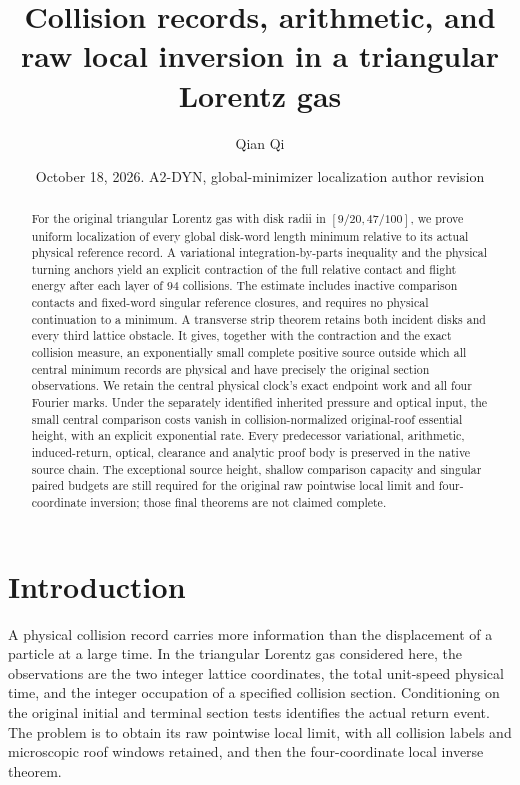 \documentclass[11pt,reqno]{amsart}
\title[Collision records and raw local inversion]{Collision records, arithmetic, and raw local inversion in a triangular Lorentz gas}
\author{Qian Qi}
\date{October 18, 2026. A2-DYN, global-minimizer localization author revision}
\numberwithin{equation}{section}
\theoremstyle{definition}\newtheorem{definition}[theorem]{Definition}
\theoremstyle{remark}\newtheorem{remark}[theorem]{Remark}
\begin{document}
\raggedbottom
\begin{abstract}
For the original triangular Lorentz gas with disk radii in
$[9/20,47/100]$, we prove uniform localization of every global
disk-word length minimum relative to its actual physical reference
record.  A variational integration-by-parts inequality and the
physical turning anchors yield an explicit contraction of the full
relative contact and flight energy after each layer of $94$
collisions.  The estimate includes inactive comparison contacts and
fixed-word singular reference closures, and requires no physical
continuation to a minimum.  A transverse strip theorem retains both
incident disks and every third lattice obstacle.  It gives, together
with the contraction and the exact collision measure, an
exponentially small complete positive source outside which all
central minimum records are physical and have precisely the original
section observations.  We retain the central physical clock's exact
endpoint work and all four Fourier marks.  Under the separately
identified inherited pressure and optical input, the small central
comparison costs vanish in collision-normalized original-roof
essential height, with an explicit exponential rate.  Every
predecessor variational, arithmetic, induced-return, optical,
clearance and analytic proof body is preserved in the native source
chain.  The exceptional source height, shallow comparison capacity
and singular paired budgets are still required for the original
raw pointwise local limit and four-coordinate inversion; those final
theorems are not claimed complete.
\end{abstract}
\maketitle

\section*{Introduction}
A physical collision record carries more information than the
displacement of a particle at a large time.  In the triangular
Lorentz gas considered here, the observations are the two integer
lattice coordinates, the total unit-speed physical time, and the
integer occupation of a specified collision section.  Conditioning
on the original initial and terminal section tests identifies the
actual return event.  The problem is to obtain its raw pointwise
local limit, with all collision labels and microscopic roof windows
retained, and then the four-coordinate local inverse theorem.
\end{document}
